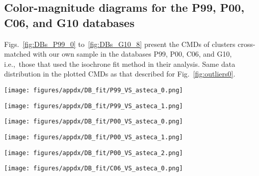 \documentclass[draft]{aa}
\renewcommand{\includegraphics}[2][]{}
\begin{document}
\begin{appendix}
\section{Color-magnitude diagrams for the P99, P00, C06, and G10 databases}
\label{apdx:databases}

Figs.~\ref{fig:DBs_P99_0} to~\ref{fig:DBs_G10_8} present the CMDs of clusters
cross-matched with our own sample in the databases P99, P00, C06, and G10, i.e.,\ those that used the isochrone fit method in their analysis.
%
Same data distribution in the plotted CMDs as that described for
Fig.~\ref{fig:outliers0}.

\begin{figure*}
\texttt{[image: figures/appdx/DB\_fit/P99\_VS\_asteca\_0.png]}
\caption{CMDs for the P99 database.}
\label{fig:DBs_P99_0}
\end{figure*}
\clearpage

\begin{figure*}
\texttt{[image: figures/appdx/DB\_fit/P99\_VS\_asteca\_1.png]}
\caption{CMDs for the P99 database.}
\label{fig:DBs_P99_1}
\end{figure*}
\clearpage

\begin{figure*}
\texttt{[image: figures/appdx/DB\_fit/P00\_VS\_asteca\_0.png]}
\caption{CMDs for the P00 database.}
\label{fig:DBs_P00_0}
\end{figure*}
\clearpage

\begin{figure*}
\texttt{[image: figures/appdx/DB\_fit/P00\_VS\_asteca\_1.png]}
\caption{CMDs for the P00 database.}
\label{fig:DBs_P00_1}
\end{figure*}
\clearpage

\begin{figure*}
\texttt{[image: figures/appdx/DB\_fit/P00\_VS\_asteca\_2.png]}
\caption{CMDs for the P00 database.}
\label{fig:DBs_P00_2}
\end{figure*}
\clearpage

\begin{figure*}
\texttt{[image: figures/appdx/DB\_fit/C06\_VS\_asteca\_0.png]}
\caption{CMDs for the C06 database.}
\label{fig:DBs_C06_0}
\end{figure*}
\clearpage


\end{appendix}
\end{document}
